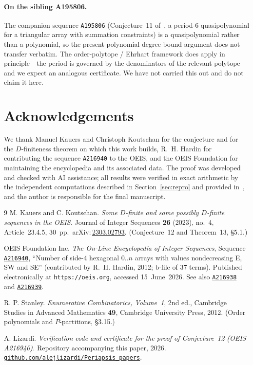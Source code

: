 \documentclass[11pt]{article}
\theoremstyle{plain}
\theoremstyle{definition}
\theoremstyle{remark}
\newcommand{\OEIS}[1]{\texttt{#1}}
\begin{document}
\paragraph{On the sibling A195806.} The companion sequence \OEIS{A195806} (Conjecture~11
of~\cite{KK23}, a period-$6$ quasipolynomial for a triangular array with summation constraints)
is a quasipolynomial rather than a polynomial, so the present polynomial-degree-bound argument
does not transfer verbatim. The order-polytope / Ehrhart framework does apply in
principle---the period is governed by the denominators of the relevant polytope---and we expect
an analogous certificate. We have not carried this out and do not claim it here.

\section*{Acknowledgements}

We thank Manuel Kauers and Christoph Koutschan for the conjecture and for the $D$-finiteness
theorem on which this work builds, R.~H. Hardin for contributing the sequence \OEIS{A216940} to
the OEIS, and the OEIS Foundation for maintaining the encyclopedia and its associated data.
The proof was developed and checked with AI assistance; all results were verified in exact
arithmetic by the independent computations described in Section~\ref{sec:repro} and provided
in~\cite{REPO}, and the author is responsible for the final manuscript.

\begin{thebibliography}{9}
 M. Kauers and C. Koutschan.
\emph{Some $D$-finite and some possibly $D$-finite sequences in the OEIS.}
Journal of Integer Sequences \textbf{26} (2023), no.~4, Article~23.4.5, 30~pp.
\,arXiv:\,\href{https://arxiv.org/abs/2303.02793}{2303.02793}.
(Conjecture~12 and Theorem~13, \S5.1.)

 OEIS Foundation Inc.
\emph{The On-Line Encyclopedia of Integer Sequences}, Sequence
\href{https://oeis.org/A216940}{\OEIS{A216940}}, ``Number of side-4 hexagonal $0..n$ arrays
with values nondecreasing E, SW and SE'' (contributed by R.~H. Hardin, 2012; b-file of
$37$ terms). Published electronically at \texttt{https://oeis.org}, accessed 15~June~2026.
See also \href{https://oeis.org/A216938}{\OEIS{A216938}} and
\href{https://oeis.org/A216939}{\OEIS{A216939}}.

 R. P. Stanley.
\emph{Enumerative Combinatorics, Volume~1}, 2nd ed., Cambridge Studies in Advanced Mathematics
\textbf{49}, Cambridge University Press, 2012. (Order polynomials and $P$-partitions, \S3.15.)

 A. Lizardi.
\emph{Verification code and certificate for the proof of Conjecture~12 (OEIS A216940).}
Repository accompanying this paper, 2026.
\href{https://github.com/alejlizardi/Periapsis_papers}{\texttt{github.com/alejlizardi/Periapsis\_papers}}.
\end{thebibliography}
\end{document}
